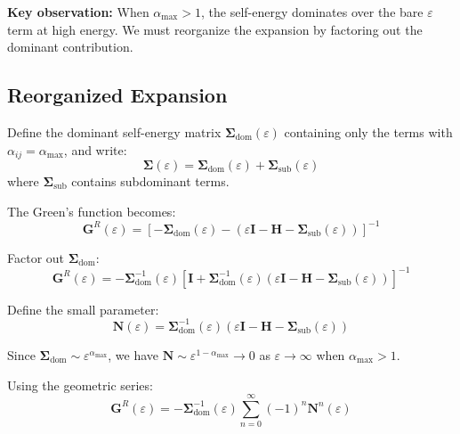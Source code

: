 \documentclass[12pt]{article}
\begin{document}
\textbf{Key observation:} When $\alpha_{\max} > 1$, the self-energy dominates over the bare $\varepsilon$ term at high energy. We must reorganize the expansion by factoring out the dominant contribution.

\subsection{Reorganized Expansion}

Define the dominant self-energy matrix $\mathbf{\Sigma}_{\text{dom}}(\varepsilon)$ containing only the terms with $\alpha_{ij} = \alpha_{\max}$, and write:
\begin{equation}
\mathbf{\Sigma}(\varepsilon) = \mathbf{\Sigma}_{\text{dom}}(\varepsilon) + \mathbf{\Sigma}_{\text{sub}}(\varepsilon)
\end{equation}
where $\mathbf{\Sigma}_{\text{sub}}$ contains subdominant terms.

The Green's function becomes:
\begin{equation}
\mathbf{G}^R(\varepsilon) = \left[-\mathbf{\Sigma}_{\text{dom}}(\varepsilon) - \left(\varepsilon \mathbf{I} - \mathbf{H} - \mathbf{\Sigma}_{\text{sub}}(\varepsilon)\right)\right]^{-1}
\end{equation}

Factor out $\mathbf{\Sigma}_{\text{dom}}$:
\begin{equation}
\mathbf{G}^R(\varepsilon) = -\mathbf{\Sigma}_{\text{dom}}^{-1}(\varepsilon) \left[\mathbf{I} + \mathbf{\Sigma}_{\text{dom}}^{-1}(\varepsilon)\left(\varepsilon \mathbf{I} - \mathbf{H} - \mathbf{\Sigma}_{\text{sub}}(\varepsilon)\right)\right]^{-1}
\end{equation}

Define the small parameter:
\begin{equation}
\mathbf{N}(\varepsilon) = \mathbf{\Sigma}_{\text{dom}}^{-1}(\varepsilon)\left(\varepsilon \mathbf{I} - \mathbf{H} - \mathbf{\Sigma}_{\text{sub}}(\varepsilon)\right)
\end{equation}

Since $\mathbf{\Sigma}_{\text{dom}} \sim \varepsilon^{\alpha_{\max}}$, we have $\mathbf{N} \sim \varepsilon^{1-\alpha_{\max}} \to 0$ as $\varepsilon \to \infty$ when $\alpha_{\max} > 1$.

Using the geometric series:
\begin{equation}
\mathbf{G}^R(\varepsilon) = -\mathbf{\Sigma}_{\text{dom}}^{-1}(\varepsilon) \sum_{n=0}^{\infty} (-1)^n \mathbf{N}^n(\varepsilon)
\end{equation}
\end{document}
